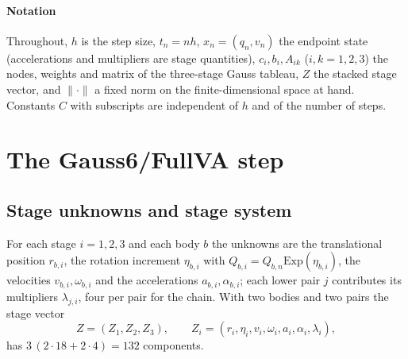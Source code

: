 \documentclass[preprint,12pt]{elsarticle}
\newcommand{\method}{Gauss6\slash FullVA}
\begin{document}
\paragraph{Notation}
Throughout, $h$ is the step size, $t_n=nh$, $x_n=(q_n,v_n)$ the endpoint state (accelerations and
multipliers are stage quantities), $c_i,b_i,A_{ik}$ ($i,k=1,2,3$) the nodes, weights and matrix of
the three-stage Gauss tableau, $Z$ the stacked stage vector, and $\|\cdot\|$ a fixed norm on the
finite-dimensional space at hand. Constants $C$ with subscripts are independent of $h$ and of the
number of steps.

\section{The \method{} step}
\label{sec:method}

\subsection{Stage unknowns and stage system}

For each stage $i=1,2,3$ and each body $b$ the unknowns are the translational position $r_{b,i}$,
the rotation increment $\eta_{b,i}$ with $Q_{b,i}=Q_{b,n}\mathrm{Exp}(\eta_{b,i})$, the velocities
$v_{b,i},\omega_{b,i}$ and the accelerations $a_{b,i},\alpha_{b,i}$; each lower pair $j$
contributes its multipliers $\lambda_{j,i}$, four per pair for the chain. With two bodies and two
pairs the stage vector
\begin{equation}
  Z=(Z_1,Z_2,Z_3),\qquad Z_i=(r_i,\eta_i,v_i,\omega_i,a_i,\alpha_i,\lambda_i),
  \label{eq:stage-variable-block}
\end{equation}
has $3\,(2\cdot18+2\cdot4)=132$ components.
\end{document}
